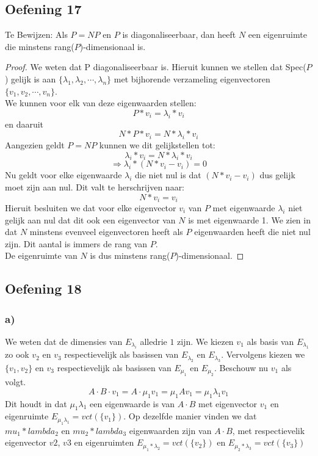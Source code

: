 \documentclass[lineaire_algebra_oplossingen.tex]{subfiles}
\begin{document}
\subsection{Oefening 17}

Te Bewijzen:
Als $P = NP$ en $P$ is diagonaliseerbaar, dan heeft $N$ een eigenruimte die minstens rang($P$)-dimensionaal is.
\begin{proof}
We weten dat P diagonaliseerbaar is. Hieruit kunnen we stellen dat Spec($P$) gelijk is aan $\{\lambda_1, \lambda_2,\cdots,\lambda_n\}$ met bijhorende verzameling eigenvectoren $\{v_1, v_2,\cdots,v_n\}$.\\
We kunnen voor elk van deze eigenwaarden stellen:
\[P*v_i = \lambda_i*v_i\]
en daaruit
\[N*P*v_i = N*\lambda_i*v_i\]
Aangezien geldt $P=NP$ kunnen we dit gelijkstellen tot:
\[\lambda_i*v_i = N*\lambda_i*v_i\]
\[\Rightarrow \lambda_i * (N*v_i - v_i) = 0\]
Nu geldt voor elke eigenwaarde $\lambda_i$ die niet nul is dat $(N*v_i - v_i)$ dus gelijk moet zijn aan nul. Dit valt te herschrijven naar:
\[N*v_i = v_i\]
Hieruit besluiten we dat voor elke eigenvector $v_i$ van $P$ met eigenwaarde $\lambda_i$ niet gelijk aan nul dat dit ook een eigenvector van $N$ is met eigenwaarde 1.
We zien in dat $N$ minstens evenveel eigenvectoren heeft als $P$ eigenwaarden heeft die niet nul zijn. Dit aantal is immers de rang van $P$. \\
De eigenruimte van $N$ is dus minstens rang($P$)-dimensionaal.
\end{proof}


\subsection{Oefening 18}
\subsubsection*{a)}
We weten dat de dimensies van $E_{\lambda_i}$ alledrie $1$ zijn.
We kiezen $v_1$ als basis van $E_{\lambda_1}$ zo ook $v_2$ en $v_3$ respectievelijk als basissen van $E_{\lambda_2}$ en $E_{\lambda_3}$.
Vervolgens kiezen we $\{v_1,v_2\}$ en $v_3$ respectievelijk als basissen van $E_{\mu_1}$ en $E_{\mu_2}$.
Beschouw nu $v_1$ als volgt.
\[
A\cdot B\cdot v_1 = A\cdot\mu_1v_1 = \mu_1Av_1= \mu_1\lambda_1v_1
\]
Dit houdt in dat $\mu_1\lambda_1$ een eigenwaarde is van $A\cdot B$ met eigenvector $v_1$ en eigenruimte $E_{\mu_1\lambda_1} = vct(\{v_1\})$. Op dezelfde manier vinden we dat $mu_1*lambda_2$ en $mu_2*lambda_3$ eigenwaarden zijn van $A\cdot B$, met respectievelik eigenvector $v2$, $v3$ en eigenruimten $E_{\mu_1*\lambda_2} = vct(\{v_2\})$ en $E_{\mu_2*  \lambda_3} = vct(\{v_3\})$
\end{document}
